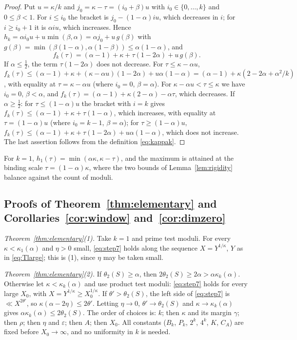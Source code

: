 \documentclass[11pt]{amsart}
\theoremstyle{remark}
\numberwithin{equation}{section}
\newcommand{\eps}{\varepsilon}
\begin{document}
\begin{proof}
Put $u=\kappa/k$ and $j_0=\kappa-\tau=(i_0+\beta)u$ with $i_0\in\{0,\dots,k\}$ and $0\le\beta<1$. For $i\le i_0$ the bracket is $j_0-(1-\alpha)iu$, which decreases in $i$; for $i\ge i_0+1$ it is $\alpha iu$, which increases. Hence $h_k=\alpha i_0u+u\min(\beta,\alpha)=\alpha j_0+u\,g(\beta)$ with $g(\beta)=\min(\beta(1-\alpha),\alpha(1-\beta))\le\alpha(1-\alpha)$, and
\[
f_k(\tau)=(\alpha-1)+\kappa+\tau(1-2\alpha)+u\,g(\beta).
\]
If $\alpha\le\tfrac12$, the term $\tau(1-2\alpha)$ does not decrease. For $\tau\le\kappa-\alpha u$, $f_k(\tau)\le(\alpha-1)+\kappa+(\kappa-\alpha u)(1-2\alpha)+u\alpha(1-\alpha)=(\alpha-1)+\kappa(2-2\alpha+\alpha^2/k)$, with equality at $\tau=\kappa-\alpha u$ (where $i_0=0$, $\beta=\alpha$). For $\kappa-\alpha u<\tau\le\kappa$ we have $i_0=0$, $\beta<\alpha$, and $f_k(\tau)=(\alpha-1)+\kappa(2-\alpha)-\alpha\tau$, which decreases. If $\alpha\ge\tfrac12$: for $\tau\le(1-\alpha)u$ the bracket with $i=k$ gives $f_k(\tau)\le(\alpha-1)+\kappa+\tau(1-\alpha)$, which increases, with equality at $\tau=(1-\alpha)u$ (where $i_0=k-1$, $\beta=\alpha$); for $\tau\ge(1-\alpha)u$, $f_k(\tau)\le(\alpha-1)+\kappa+\tau(1-2\alpha)+u\alpha(1-\alpha)$, which does not increase. The last assertion follows from the definition \eqref{eq:kappak}.
\end{proof}

For $k=1$, $h_1(\tau)=\min(\alpha\kappa,\kappa-\tau)$, and the maximum is attained at the binding scale $\tau=(1-\alpha)\kappa$, where the two bounds of Lemma~\ref{lem:rigidity} balance against the count of moduli.

\subsection{Proofs of Theorem~\ref{thm:elementary} and Corollaries~\ref{cor:window} and~\ref{cor:dimzero}}

\emph{Theorem~\ref{thm:elementary}(1).} Take $k=1$ and prime test moduli. For every $\kappa<\kappa_1(\alpha)$ and $\eta>0$ small, \eqref{eq:step7} holds along the sequence $X=Y^{1/\kappa}$, $Y$ as in \eqref{eq:Tlarge}; this is (1), since $\eta$ may be taken small.

\emph{Theorem~\ref{thm:elementary}(2).} If $\theta_2(S)\ge\alpha$, then $2\theta_2(S)\ge2\alpha>\alpha\kappa_k(\alpha)$. Otherwise let $\kappa<\kappa_k(\alpha)$ and use product test moduli: \eqref{eq:step7} holds for every large $X_0$, with $X=Y^{1/\kappa}\ge X_0^{1/\kappa}$. If $\theta'>\theta_2(S)$, the left side of \eqref{eq:step7} is $\ll X^{2\theta'}$, so $\kappa(\alpha-2\eta)\le2\theta'$. Letting $\eta\to0$, $\theta'\to\theta_2(S)$ and $\kappa\to\kappa_k(\alpha)$ gives $\alpha\kappa_k(\alpha)\le2\theta_2(S)$. The order of choices is: $k$; then $\kappa$ and its margin $\gamma$; then $\rho$; then $\eta$ and $\eps$; then $A$; then $X_0$. All constants ($B_k$, $P_k$, $2^k$, $4^k$, $K$, $C_A$) are fixed before $X_0\to\infty$, and no uniformity in $k$ is needed.
\end{document}
